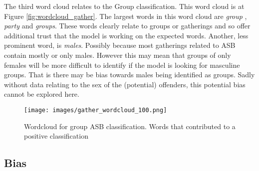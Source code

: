The third word cloud relates to the Group classification. This word cloud is at Figure \ref{fig:wordcloud_gather}. The largest words in this word cloud are \emph{group} , \emph{party} and \emph{groups}. These words clearly relate to groups or gatherings and so offer additional trust that the model is working on the expected words. Another, less prominent word, is \emph{males}. Possibly because most gatherings related to ASB contain mostly or only males. However this may mean that groups of only females will be more difficult to identify if the model is looking for masculine groups. That is there may be bias towards males being identified as groups. Sadly without data relating to the sex of the (potential) offenders, this potential bias cannot be explored here. 


\begin{figure}[h]
    \texttt{[image: images/gather\_wordcloud\_100.png]}
    \caption[Wordcloud for group ASB classification.]{{Wordcloud for group ASB classification.} Words that contributed to a positive classification}
    \label{fig: wordcloud_gather}
\end{figure}
   


\subsection{Bias}



